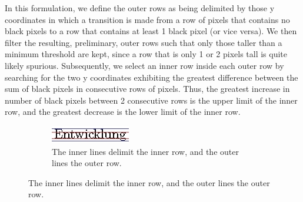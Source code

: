 \documentclass{llncs}
\begin{document}
In this formulation, we define the outer rows as being delimited by those y coordinates in which a transition is made from a row of pixels that contains no black pixels to a row that contains at least 1 black pixel (or vice versa). We then filter the resulting, preliminary, outer rows such that only those taller than a minimum threshold are kept, since a row that is only 1 or 2 pixels tall is quite likely spurious. Subsequently, we select an inner row inside each outer row by searching for the two y coordinates exhibiting the greatest difference between the sum of black pixels in consecutive rows of pixels. Thus, the greatest increase in number of black pixels between 2 consecutive rows is the upper limit of the inner row, and the greatest decrease is the lower limit of the inner row. 

\begin{figure}[t]
    \setlength{\abovecaptionskip}{4pt plus 1.0pt minus 2.0pt}
    \begin{minipage}[b]{0.44\textwidth}
        \begin{subfigure}[b]{\textwidth}
          \includegraphics[width=\textwidth]{innerOuterRows300.jpg}
          \caption{The inner lines delimit the inner row, and the outer lines the outer row.}
        \end{subfigure}
        \vspace{1em}


\end{minipage}
\end{figure}
\end{document}
